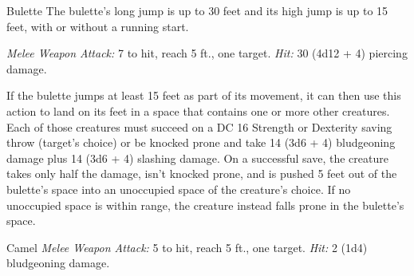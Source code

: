 \documentclass[10pt,a4paper,twoside,bg=print,twocolumn,openany,nodeprecatedcode]{dndbook}
\begin{document}
\begin{DndMonster}[float=t]{Bulette}
\DndMonsterBasics[
armor-class = {17 (natural armor)},
hit-points = {\DndDice{9d10 + 45}},
speed = {40 ft., burrow 40 ft.}
]
\DndMonsterAbilityScores[
 str = 19,
 dex = 11,
 con = 21,
 int = 2,
 wis = 10,
 cha = 5
]
\DndMonsterDetails[
skills = {Perception +6},
senses = {darkvision 60 ft., tremorsense 60 ft., passive perception 16},
challenge = 5,
]
The bulette's long jump is up to 30 feet and its high jump is up to 15 feet, with or without a running start.

\textsl{Melee Weapon Attack:} 7 to hit, reach 5 ft., one target. \textsl{Hit:} 30 (4d12 + 4) piercing damage.

If the bulette jumps at least 15 feet as part of its movement, it can then use this action to land on its feet in a space that contains one or more other creatures. Each of those creatures must succeed on a DC 16 Strength or Dexterity saving throw (target's choice) or be knocked prone and take 14 (3d6 + 4) bludgeoning damage plus 14 (3d6 + 4) slashing damage. On a successful save, the creature takes only half the damage, isn't knocked prone, and is pushed 5 feet out of the bulette's space into an unoccupied space of the creature's choice. If no unoccupied space is within range, the creature instead falls prone in the bulette's space.

\end{DndMonster}



\begin{DndMonster}[float=t]{Camel}
\DndMonsterBasics[
armor-class = {9},
hit-points = {\DndDice{2d10 + 4}},
speed = {50 ft.}
]
\DndMonsterAbilityScores[
 str = 16,
 dex = 8,
 con = 14,
 int = 2,
 wis = 8,
 cha = 5
]
\DndMonsterDetails[
challenge = 1/8,
]
\textsl{Melee Weapon Attack:} 5 to hit, reach 5 ft., one target. \textsl{Hit:} 2 (1d4) bludgeoning damage.

\end{DndMonster}
\end{document}
